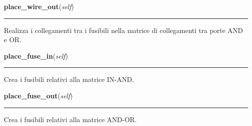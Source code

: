     \label{pla:Pla:place_wire_out}

    \vspace{0.5ex}

\hspace{.8\funcindent}\begin{boxedminipage}{\funcwidth}

    \raggedright \textbf{place\_wire\_out}(\textit{self})

    \vspace{-1.5ex}

    \rule{\textwidth}{0.5\fboxrule}
\setlength{\parskip}{2ex}
    Realizza i collegamenti tra i fusibili nella matrice di collegamenti 
    tra porte AND e OR.

\setlength{\parskip}{1ex}
    \end{boxedminipage}

    \label{pla:Pla:place_fuse_in}

    \vspace{0.5ex}

\hspace{.8\funcindent}\begin{boxedminipage}{\funcwidth}

    \raggedright \textbf{place\_fuse\_in}(\textit{self})

    \vspace{-1.5ex}

    \rule{\textwidth}{0.5\fboxrule}
\setlength{\parskip}{2ex}
    Crea i fusibili relativi alla matrice IN-AND.

\setlength{\parskip}{1ex}
    \end{boxedminipage}

    \label{pla:Pla:place_fuse_out}

    \vspace{0.5ex}

\hspace{.8\funcindent}\begin{boxedminipage}{\funcwidth}

    \raggedright \textbf{place\_fuse\_out}(\textit{self})

    \vspace{-1.5ex}

    \rule{\textwidth}{0.5\fboxrule}
\setlength{\parskip}{2ex}
    Crea i fusibili relativi alla matrice AND-OR.

\setlength{\parskip}{1ex}
    \end{boxedminipage}

